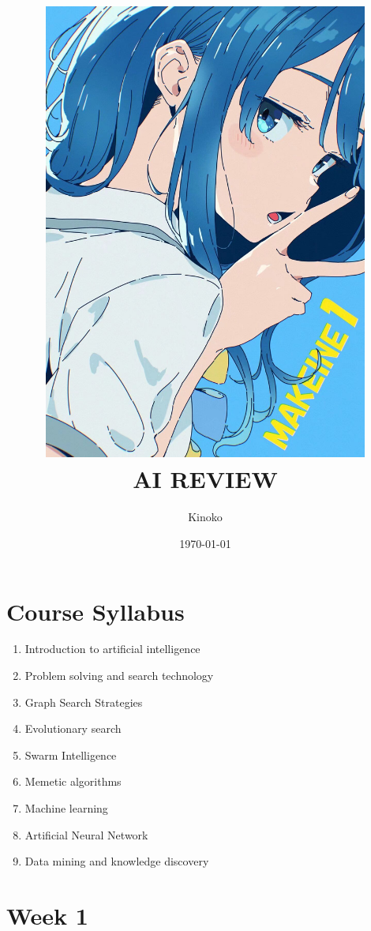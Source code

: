 \documentclass[a4paper, 12pt]{article}
\title{
    \includegraphics[width=0.8\textwidth]{Yanami_ep1.JPG}\\  %
    AI REVIEW
}
\author{Kinoko}
\date{\today}
\begin{document}

\begin{titlepage}  
    \maketitle
\end{titlepage}

\fancyhead[R]{}  %

\tableofcontents
\newpage  %


\section*{Course Syllabus}  %
    \begin{enumerate}
        \item Introduction to artificial intelligence
        \item Problem solving and search technology
        \item Graph Search Strategies
        \item Evolutionary search
        \item Swarm Intelligence
        \item Memetic algorithms 
        \item Machine learning
        \item Artificial Neural Network
        \item Data mining and knowledge discovery
    \end{enumerate}

\newpage

\setcounter{section}{0}

\section{Week 1}
\end{document}

